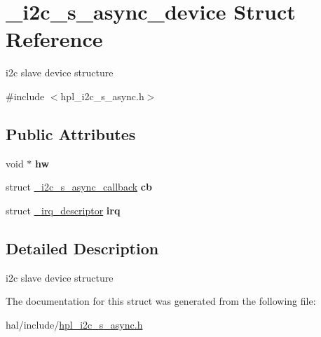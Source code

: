 \hypertarget{struct__i2c__s__async__device}{}\section{\+\_\+i2c\+\_\+s\+\_\+async\+\_\+device Struct Reference}
\label{struct__i2c__s__async__device}


i2c slave device structure  




{\ttfamily \#include $<$hpl\+\_\+i2c\+\_\+s\+\_\+async.\+h$>$}

\subsection*{Public Attributes}
\begin{DoxyCompactItemize}
\item 
\mbox{\label{struct__i2c__s__async__device_acb2679065f46ba8be70a4ff3ecf6454b}} 
void $\ast$ {\bfseries hw}
\item 
\mbox{\label{struct__i2c__s__async__device_aa86a5bf13b22a1f9a3acb51438d33910}} 
struct \hyperlink{struct__i2c__s__async__callback}{\+\_\+i2c\+\_\+s\+\_\+async\+\_\+callback} {\bfseries cb}
\item 
\mbox{\label{struct__i2c__s__async__device_a2a37d8f25b564d56f864fc091df27acc}} 
struct \hyperlink{struct__irq__descriptor}{\+\_\+irq\+\_\+descriptor} {\bfseries irq}
\end{DoxyCompactItemize}


\subsection{Detailed Description}
i2c slave device structure 

The documentation for this struct was generated from the following file\+:\begin{DoxyCompactItemize}
\item 
hal/include/\hyperlink{hpl__i2c__s__async_8h}{hpl\+\_\+i2c\+\_\+s\+\_\+async.\+h}\end{DoxyCompactItemize}
